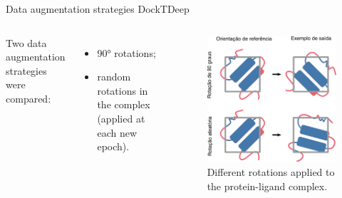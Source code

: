 \documentclass[aspectratio=169,xcolor=dvipsnames]{beamer}
\begin{document}
\begin{frame}{Data augmentation strategies \hfill {\footnotesize \alert{DockTDeep}}}
    \begin{columns}[c]
        Two data augmentation strategies were compared:
        \begin{itemize}
            \item 90° rotations;
            \item random rotations in the complex (applied at each new epoch).
        \end{itemize}

        \begin{figure}
            \centering
            \includegraphics[width=.85\linewidth]{imgs/rotation-types.png}
            \caption{Different rotations applied to the protein-ligand complex.}
        \end{figure}

    \end{columns}
\end{frame}
\end{document}
